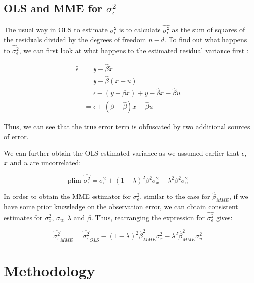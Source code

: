 \documentclass{article}
\begin{document}
\subsection{OLS and MME for $\sigma_\epsilon^2$}

The usual way in OLS to estimate $\sigma_\epsilon^2$ is to calculate $\hat{\sigma^2_\epsilon}$ as the sum of squares of the residuals divided by the degrees of freedom $n-d$. To find out what happens to $\hat{\sigma^2_\epsilon}$, we can first look at what happens to the estimated residual variance first \cite{lecturenotes}:

\begin{equation}
    \begin{split}
        \hat{\epsilon}  &= y - \hat{\beta} \tilde{x} \\
                        &= y - \hat{\beta}(x+u) \\
                        &= \epsilon - (y - \beta x) + y - \hat{\beta}x - \hat{\beta}u \\
                        &= \epsilon + (\beta - \hat{\beta})x - \hat{\beta}u
    \end{split} 
\end{equation}

Thus, we can see that the true error term is obfuscated by two additional sources of error. 

We can further obtain the OLS estimated variance as we assumed earlier that $\epsilon$, $x$ and $u$ are uncorrelated:

\begin{equation}
    \textrm{plim } \hat{\sigma^2_\epsilon} = \sigma_\epsilon^2 + (1-\lambda)^2 \beta^2 \sigma_x^2 + \lambda^2 \beta^2 \sigma_u^2   
\end{equation}

In order to obtain the MME estimator for $\sigma^2_\epsilon$, similar to the case for $\hat{\beta}_{MME}$, if we have some prior knowledge on the observation error, we can obtain consistent estimates for $\sigma_x^2$, $\sigma_u$, $\lambda$ and $\beta$.
Thus, rearranging the expression for $\hat{\sigma^2_\epsilon}$ gives:

\begin{equation}
    \hat{\sigma_\epsilon^2}_{MME} = \hat{\sigma^2_\epsilon}_{OLS} -  (1-\lambda)^2 \hat{\beta}_{MME}^2 \sigma_x^2 - \lambda^2 \hat{\beta}_{MME}^2 \sigma_u^2   
\end{equation}

\section{Methodology}
\end{document}
